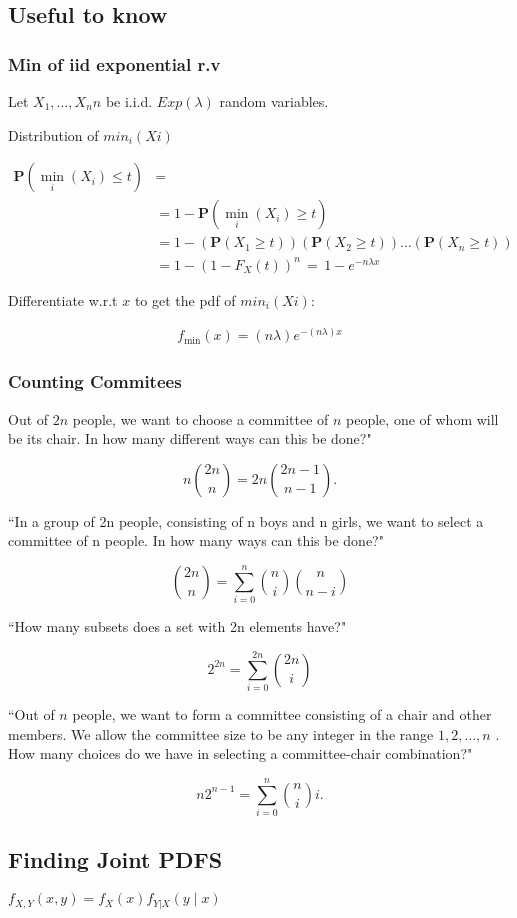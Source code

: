 \subsection{Useful to know}

\subsubsection{Min of iid exponential r.v}
Let  $X_1,\ldots,X_nn$  be i.i.d. $Exp(\lambda)$ random variables.

Distribution of $min_i(Xi)$ 

\begin{align*}
   \mathbf{P}(\min _ i (X_ i)\leq t) &=\\
&=1-\mathbf{P}(\min _ i (X_ i)\geq t)\\
&=1-(\mathbf{P}(X_1\geq t))(\mathbf{P}(X_2\geq t))\ldots (\mathbf{P}(X_ n\geq t))\\
&=1-(1-F_ X(t))^ n \, =\, 1-e^{-n\lambda x}
\end{align*}

Differentiate w.r.t $x$ to get the pdf of $min_i(Xi)$:

\begin{align*}
f_{\text {min}}(x)= (n\lambda ) e^{-(n\lambda ) x}
\end{align*}

\subsubsection{Counting Commitees}

Out of  $2n$  people, we want to choose a committee of $n$ people, one of whom will be its chair. In how many different ways can this be done?" 

$$n\binom {2n}{n}=2n\binom {2n-1}{n-1}.$$

“In a group of  2n  people, consisting of  n  boys and  n  girls, we want to select a committee of  n  people. In how many ways can this be done?"

$$\binom {2n}{n}=\sum _{i=0}^ n \binom {n}{i}\binom {n}{n-i}$$

“How many subsets does a set with  2n  elements have?" 

$$2^{2n}=\sum _{i=0}^{2n}\binom {2n}{i}$$

“Out of  $n$  people, we want to form a committee consisting of a chair and other members. We allow the committee size to be any integer in the range  $1,2,\ldots,n$ . How many choices do we have in selecting a committee-chair combination?"

$$n2^{n-1}=\sum _{i=0}^ n \binom {n}{i}i.$$

\subsection{Finding Joint PDFS}

$f_{X,Y}(x,y)=f_ X(x)f_{Y|X}(y\mid x)$
